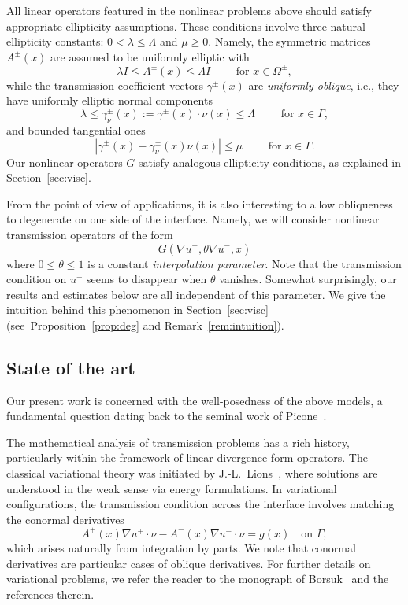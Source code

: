 \documentclass[letter,11pt]{amsart}
\newcommand{\id}{I}
\theoremstyle{definition}
\numberwithin{equation}{section}
\begin{document}
\medskip

All linear operators featured in the nonlinear problems above should satisfy appropriate ellipticity assumptions.
These conditions involve three natural ellipticity constants:
$0 < \lambda \leq \Lambda$ and $\mu \geq 0$.
Namely, the symmetric matrices $A^{\pm}(x)$ are assumed to be uniformly elliptic with
\[
\lambda \id \leq A^{\pm}(x) \leq \Lambda \id \qquad \text{ for } x \in \Omega^{\pm},
\]
while the transmission coefficient vectors $\gamma^{\pm}(x)$ are \emph{uniformly oblique}, i.e., they have uniformly elliptic normal components
\[
\lambda \leq \gamma^{\pm}_{\nu}(x) := \gamma^{\pm}(x) \cdot \nu(x) \leq \Lambda \qquad \text{ for } x \in \Gamma,
\]
and bounded tangential ones
\[
|\gamma^{\pm}(x) - \gamma^{\pm}_{\nu}(x) \nu(x)| \leq \mu \qquad \text{ for } x \in \Gamma.
\]
Our nonlinear operators $G$ satisfy analogous ellipticity conditions, as explained in Section~\ref{sec:visc}.

\medskip

From the point of view of applications, it is also interesting to allow obliqueness to degenerate on one side of the interface.
Namely, we will consider nonlinear transmission operators of the form
\[
G(\nabla u^{+}, \theta \nabla u^{-}, x)
\]
where $0 \leq \theta \leq 1$ is a constant \emph{interpolation parameter}.
Note that  the transmission condition on $u^{-}$ seems to disappear when $\theta$ vanishes.
Somewhat surprisingly, our results and estimates below are all independent of this parameter.
We give the intuition behind this phenomenon in Section~\ref{sec:visc} (see~Proposition~\ref{prop:deg} and Remark~\ref{rem:intuition}).

\medskip

\subsection{State of the art}

Our present work is concerned with the well-posedness of the above models, a fundamental question dating back to the seminal work of Picone~\cite{P}.

\medskip

The mathematical analysis of transmission problems has a rich history, particularly within the framework of linear divergence-form operators.
The classical variational theory was initiated by J.-L.~Lions~\cite{JLL}, where solutions are understood in the weak sense via energy formulations. 
In variational configurations, the transmission condition across the interface involves matching the conormal derivatives
\[
A^{+}(x)\nabla u^{+} \cdot \nu - A^{-}(x)\nabla u^{-} \cdot \nu = g(x) \quad \text{on } \Gamma,
\]
which arises naturally from integration by parts.
We note that conormal derivatives are particular cases of oblique derivatives.
For further details on variational problems, we refer the reader to the monograph of Borsuk~\cite{B} and the references therein.
\end{document}
